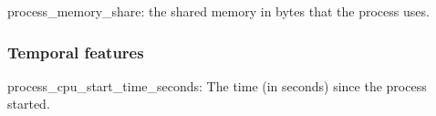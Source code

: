 \documentclass{iosart2c}
\begin{document}
process\_memory\_share: the shared memory in bytes that the process uses.\\

\subsubsection{Temporal features}

process\_cpu\_start\_time\_seconds: The time (in seconds) since the process started.





%
%

%
\end{document}
